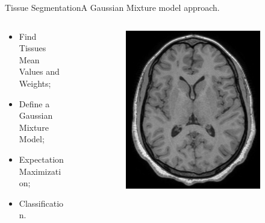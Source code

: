 \documentclass[]{standalone}
\begin{document}
	\begin{frame}{Tissue Segmentation}{A Gaussian Mixture model approach.}
	
	\vspace{-25pt}
		\begin{columns}
			\begin{column}{0.4\textwidth}
				\begin{itemize}
				\item Find Tissues Mean Values and Weights;
				\item Define a Gaussian Mixture Model;
				\item Expectation Maximization;
				\item Classification.
				\end{itemize}
			\end{column}
			\begin{column}{0.7\textwidth}
			\begin{figure}[h!]
			\centering

				\begin{subfigure}{0.45\textwidth}
					
					\includegraphics[scale=0.055]{./IMG/T1.jpg}
				\end{subfigure}
				\hspace{15pt}
				\begin{subfigure}{0.45\textwidth}
					

\end{subfigure}
\end{figure}
\end{column}
\end{columns}
\end{frame}
\end{document}
